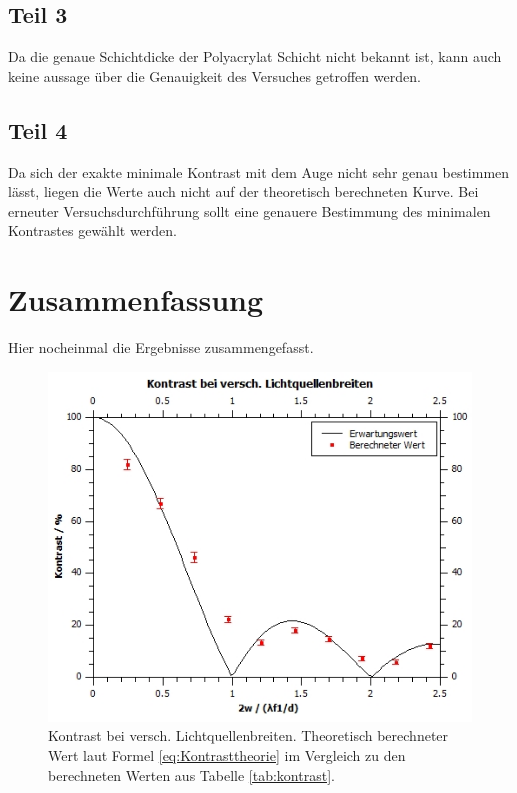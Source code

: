 \documentclass[12pt,a4paper,twoside]{article}
\begin{document}
\subsection{Teil 3}
Da die genaue Schichtdicke der Polyacrylat Schicht nicht bekannt ist, kann auch keine aussage über die Genauigkeit des Versuches getroffen werden. 

\subsection{Teil 4}
Da sich der exakte minimale Kontrast mit dem Auge nicht sehr genau bestimmen lässt, liegen die Werte auch nicht auf der theoretisch berechneten Kurve. 
Bei erneuter Versuchsdurchführung sollt eine genauere Bestimmung des minimalen Kontrastes gewählt werden. 

\section{Zusammenfassung} %
Hier nocheinmal die Ergebnisse zusammengefasst. 

\begin{figure}[H]
    \centering
    \includegraphics[width=0.7\linewidth]{nudes/kontrast.jpg}
    \caption{Kontrast bei versch. Lichtquellenbreiten. Theoretisch berechneter Wert laut Formel \ref{eq:Kontrasttheorie} im Vergleich zu den berechneten Werten aus Tabelle \ref{tab:kontrast}. }
    \label{fig: zus aufgabe 1 kontrast}
\end{figure}
\end{document}
